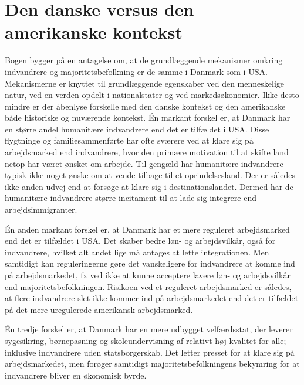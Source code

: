 \documentclass[
]{book}
\begin{document}
\section{Den danske versus den amerikanske kontekst}\label{den-danske-versus-den-amerikanske-kontekst}

Bogen bygger på en antagelse om, at de grundlæggende mekanismer omkring indvandrere og majoritetsbefolkning er de samme i Danmark som i USA. Mekanismerne er knyttet til grundlæggende egenskaber ved den menneskelige natur, ved en verden opdelt i nationalstater og ved markedsøkonomier. Ikke desto mindre er der åbenlyse forskelle med den danske kontekst og den amerikanske både historiske og nuværende kontekst. Én markant forskel er, at Danmark har en større andel humanitære indvandrere end det er tilfældet i USA. Disse flygtninge og familiesammenførte har ofte sværere ved at klare sig på arbejdsmarked end indvandrere, hvor den primære motivation til at skifte land netop har været ønsket om arbejde. Til gengæld har humanitære indvandrere typisk ikke noget ønske om at vende tilbage til et oprindelsesland. Der er således ikke anden udvej end at forsøge at klare sig i destinationslandet. Dermed har de humanitære indvandrere større incitament til at lade sig integrere end arbejdsimmigranter.

Én anden markant forskel er, at Danmark har et mere reguleret arbejdsmarked end det er tilfældet i USA. Det skaber bedre løn- og arbejdsvilkår, også for indvandrere, hvilket alt andet lige må antages at lette integrationen. Men samtidigt kan reguleringerne gøre det vanskeligere for indvandrere at komme ind på arbejdsmarkedet, fx ved ikke at kunne acceptere lavere løn- og arbejdsvilkår end majoritetsbefolkningen. Risikoen ved et reguleret arbejdsmarked er således, at flere indvandrere slet ikke kommer ind på arbejdsmarkedet end det er tilfældet på det mere uregulerede amerikansk arbejdsmarked.

Én tredje forskel er, at Danmark har en mere udbygget velfærdsstat, der leverer sygesikring, børnepasning og skoleundervisning af relativt høj kvalitet for alle; inklusive indvandrere uden statsborgerskab. Det letter presset for at klare sig på arbejdsmarkedet, men forøger samtidigt majoritetsbefolkningens bekymring for at indvandrere bliver en økonomisk byrde.
\end{document}
